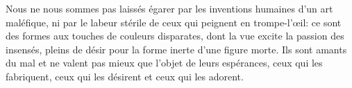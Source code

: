 Nous ne nous sommes pas laissés égarer par les inventions humaines d’un art maléfique,
	ni par le labeur stérile de ceux qui peignent en trompe-l’œil:
	ce sont des formes aux touches de couleurs disparates,
	dont la vue excite la passion des insensés,
	pleins de désir pour la forme inerte d’une figure morte.
Ils sont amants du mal et ne valent pas mieux que l’objet de leurs espérances,
	ceux qui les fabriquent, ceux qui les désirent et ceux qui les adorent.
